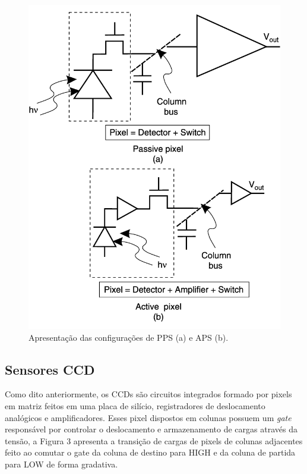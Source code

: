 \documentclass[10pt,a4paper,twocolumn]{article}
\begin{document}
	\begin{figure}[!h]
		\centering
		\includegraphics[scale=0.24]{imagens/passive_vs_active.png}
		\caption{Apresentação das configurações de PPS (a) e APS (b).}
	\end{figure}
	
	\subsection*{Sensores CCD}
	Como dito anteriormente, os CCDs são circuitos integrados formado por pixels em matriz feitos em uma placa de silício, registradores de deslocamento analógicos e amplificadores. Esses pixel dispostos em colunas possuem um \textit{gate} responsável por controlar o deslocamento e armazenamento de cargas através da tensão, a Figura 3 apresenta a transição de cargas de pixels de colunas adjacentes feito ao comutar o gate da coluna de destino para HIGH e da coluna de partida para LOW de forma gradativa.
	
\end{document}
